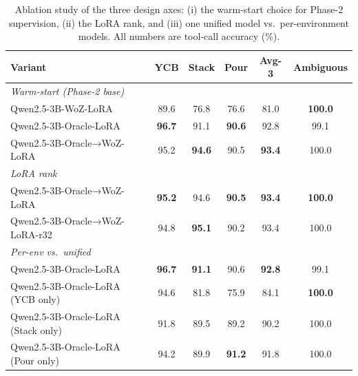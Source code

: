 \begin{table}[t]
\centering
\small
\setlength{\tabcolsep}{4pt}
\caption{Ablation study of the three design axes: (i) the warm-start choice for Phase-2 supervision, (ii) the LoRA rank, and (iii) one unified model vs.\ per-environment models. All numbers are tool-call accuracy (\%).}
\label{tab:ablations}
\begin{tabular}{lccccc}
\toprule
Variant & YCB & Stack & Pour & Avg-3 & Ambiguous \\
\midrule
\multicolumn{6}{l}{\emph{Warm-start (Phase-2 base)}} &  &  &  &  &  \\
Qwen2.5-3B-WoZ-LoRA & 89.6 & 76.8 & 76.6 & 81.0 & \textbf{100.0} \\
Qwen2.5-3B-Oracle-LoRA & \textbf{96.7} & 91.1 & \textbf{90.6} & 92.8 & 99.1 \\
Qwen2.5-3B-Oracle→WoZ-LoRA & 95.2 & \textbf{94.6} & 90.5 & \textbf{93.4} & 100.0 \\
\midrule
\multicolumn{6}{l}{\emph{LoRA rank}} &  &  &  &  &  \\
Qwen2.5-3B-Oracle→WoZ-LoRA & \textbf{95.2} & 94.6 & \textbf{90.5} & \textbf{93.4} & \textbf{100.0} \\
Qwen2.5-3B-Oracle→WoZ-LoRA-r32 & 94.8 & \textbf{95.1} & 90.2 & 93.4 & 100.0 \\
\midrule
\multicolumn{6}{l}{\emph{Per-env vs.\ unified}} &  &  &  &  &  \\
Qwen2.5-3B-Oracle-LoRA & \textbf{96.7} & \textbf{91.1} & 90.6 & \textbf{92.8} & 99.1 \\
Qwen2.5-3B-Oracle-LoRA (YCB only) & 94.6 & 81.8 & 75.9 & 84.1 & \textbf{100.0} \\
Qwen2.5-3B-Oracle-LoRA (Stack only) & 91.8 & 89.5 & 89.2 & 90.2 & 100.0 \\
Qwen2.5-3B-Oracle-LoRA (Pour only) & 94.2 & 89.9 & \textbf{91.2} & 91.8 & 100.0 \\
\bottomrule
\end{tabular}
\end{table}
